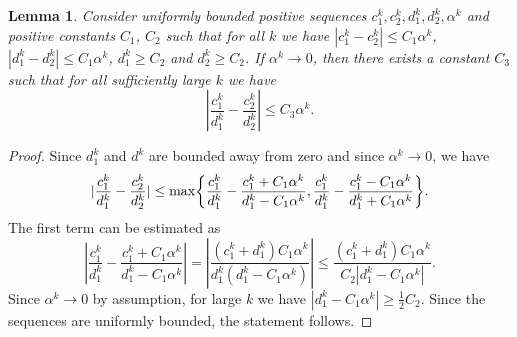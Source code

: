 \documentclass[]{interact}
\theoremstyle{plain}%
\newtheorem{lemma}[theorem]{Lemma}
\theoremstyle{definition}
\theoremstyle{remark}
\let\originalleft\left
\let\originalright\right
\renewcommand{\left}{\mathopen{}\mathclose\bgroup\originalleft}
\renewcommand{\right}{\aftergroup\egroup\originalright}
\newcommand{\norm}[1]{\|#1\|}
\newcommand{\nrm}[1]{|#1|}
\newcommand{\nrmlr}[1]{|#1|}
\begin{document}

\begin{lemma}\label{lemma:ratio}
Consider uniformly bounded positive sequences $c_1^k, c_2^k, d_1^k, d_2^k,\alpha^k$ and positive constants $C_1$, $C_2$ such that for all $k$ we have $\nrm{c_1^k-c_2^k}\le C_1\alpha^k$, $\nrm{d_1^k-d_2^k}\le C_1\alpha^k$, $d_1^k\ge C_2$ and $d_2^k\ge C_2$. If $\alpha^k\to 0$, then there exists a constant $C_3$ such that for all sufficiently large $k$ we have
$$
\nrmlr{\frac{c_1^k}{d_1^k} - \frac{c_2^k}{d_2^k}} \le C_3\alpha^k.
$$
\end{lemma}
\begin{proof}
Since $d_1^k$ and $d^k$ are bounded away from zero and since $\alpha^k\to 0$, we have
$$
  \nrmlr{\frac{c_1^k}{d_1^k} - \frac{c_2^k}{d_2^k}} \le\max\left\{ \frac{c_1^k}{d_1^k} - \frac{c_1^k+C_1\alpha^k}{d_1^k-C_1\alpha^k}, \frac{c_1^k}{d_1^k} - \frac{c_1^k-C_1\alpha^k}{d_1^k+C_1\alpha^k}
  \right\}.
$$
The first term can be estimated as
$$
\nrmlr{\frac{c_1^k}{d_1^k} - \frac{c_1^k+C_1\alpha^k}{d_1^k-C_1\alpha^k}} = \nrmlr{\frac{(c_1^k+d_1^k)C_1\alpha^k}{d_1^k(d_1^k-C_1\alpha^k)}} \le \frac{(c_1^k+d_1^k)C_1\alpha^k}{C_2|d_1^k-C_1\alpha^k|}.
$$
Since $\alpha^k\to 0$ by assumption, for large $k$ we have $\nrm{d_1^k-C_1\alpha^k}\ge \frac12C_2$. Since the sequences are uniformly bounded, the statement follows.
\end{proof}
\end{document}
